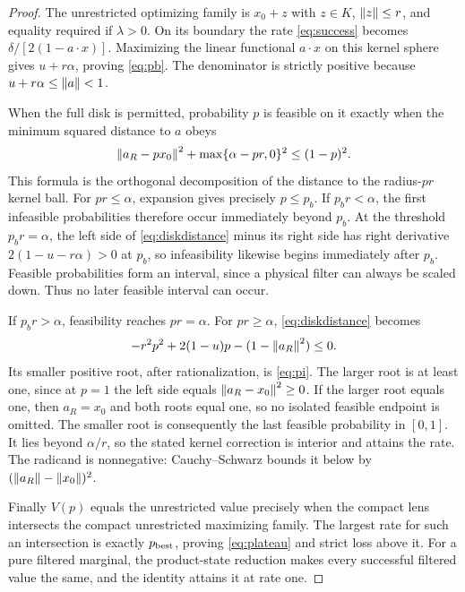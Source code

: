 \begin{proof}
The unrestricted optimizing family is $x_0+z$ with $z\in K$,
$\left\lVert z\right\rVert\leq r$, and equality required if $\lambda>0$.
On its boundary the rate \eqref{eq:success} becomes
$\delta/[2(1-a\cdot x)]$. Maximizing the linear functional $a\cdot x$
on this kernel sphere gives $u+r\alpha$, proving \eqref{eq:pb}.
The denominator is strictly positive because $u+r\alpha\leq\left\lVert a\right\rVert<1$.

When the full disk is permitted, probability $p$ is feasible on it exactly
when the minimum squared distance to $a$ obeys
\begin{equation}\label{eq:diskdistance}
 \left\lVert a_R-px_0\right\rVert^2+\max\{\alpha-pr,0\}^2\leq(1-p)^2.
\end{equation}
This formula is the orthogonal decomposition of the distance to the
radius-$pr$ kernel ball. For $pr\leq\alpha$, expansion gives precisely
$p\leq p_b$. If $p_br<\alpha$, the first infeasible probabilities
therefore occur immediately beyond $p_b$. At the threshold $p_br=\alpha$,
the left side of \eqref{eq:diskdistance} minus its right side has right
derivative $2(1-u-r\alpha)>0$ at $p_b$, so infeasibility likewise begins
immediately after $p_b$. Feasible probabilities form an
interval, since a physical filter can always be scaled down. Thus no later
feasible interval can occur.

If $p_br>\alpha$, feasibility reaches $pr=\alpha$. For $pr\geq\alpha$,
\eqref{eq:diskdistance} becomes
\[
 -r^2p^2+2(1-u)p-(1-\left\lVert a_R\right\rVert^2)\leq0.
\]
Its smaller positive root, after rationalization, is \eqref{eq:pi}.
The larger root is at least one, since at $p=1$ the left side equals
$\left\lVert a_R-x_0\right\rVert^2\geq0$. If the larger root equals one, then $a_R=x_0$
and both roots equal one, so no isolated feasible endpoint is omitted.
The smaller root is consequently the last
feasible probability in $[0,1]$. It lies beyond $\alpha/r$, so the stated
kernel correction is interior and attains the rate.
The radicand is nonnegative: Cauchy--Schwarz bounds it below by
$(\left\lVert a_R\right\rVert-\left\lVert x_0\right\rVert)^2$.

Finally $V(p)$ equals the unrestricted value precisely when the compact
lens intersects the compact unrestricted maximizing family. The largest
rate for such an intersection is exactly $p_{\rm best}$, proving
\eqref{eq:plateau} and strict loss above it.
For a pure filtered marginal, the product-state reduction makes every
successful filtered value the same, and the identity attains it at rate one.
\end{proof}

